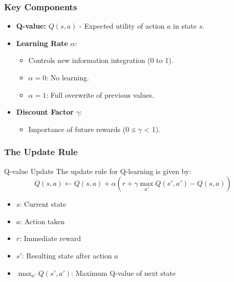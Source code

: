 \documentclass[aspectratio=169]{beamer}
\begin{document}
\begin{frame}[fragile]
    \frametitle{Key Components}
    \begin{itemize}
        \item \textbf{Q-value:} \( Q(s, a) \) - Expected utility of action \( a \) in state \( s \).
        \item \textbf{Learning Rate} \( \alpha \):
            \begin{itemize}
                \item Controls new information integration (0 to 1).
                \item \( \alpha = 0 \): No learning.
                \item \( \alpha = 1 \): Full overwrite of previous values.
            \end{itemize}
        \item \textbf{Discount Factor} \( \gamma \):
            \begin{itemize}
                \item Importance of future rewards (0 ≤ \( \gamma \) < 1).
            \end{itemize}
    \end{itemize}
\end{frame}

\begin{frame}[fragile]
    \frametitle{The Update Rule}
    \begin{block}{Q-value Update}
        The update rule for Q-learning is given by:
        \begin{equation}
        Q(s, a) \leftarrow Q(s, a) + \alpha \left( r + \gamma \max_{a'} Q(s', a') - Q(s, a) \right)
        \end{equation}
        \begin{itemize}
            \item \( s \): Current state
            \item \( a \): Action taken
            \item \( r \): Immediate reward
            \item \( s' \): Resulting state after action \( a \)
            \item \( \max_{a'} Q(s', a') \): Maximum Q-value of next state
        \end{itemize}
    \end{block}
\end{frame}
\end{document}
